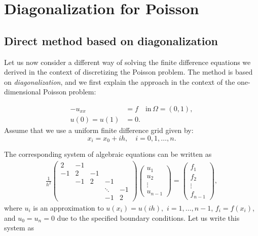 \chapter{Diagonalization for Poisson}

\section{Direct method based on diagonalization}

Let us now consider a different way of solving the finite difference equations
we derived in the context of discretizing the Poisson problem. The method is
based on \emph{diagonalization}, and we first explain the approach in the context
of the one-dimensional Poisson problem:

\begin{align*}
  -u_{xx} &= f \quad \text{in}\, \Omega = (0,1), \\
  u(0) = u(1) &= 0.
\end{align*}
Assume that we use a uniform finite difference grid given by:
\begin{equation*}
  x_i = x_0 + ih, \quad i=0,1,\ldots,n.
\end{equation*}

The corresponding system of algebraic equations can be written as
\begin{align*}
  \frac{1}{h^2}
  \begin{pmatrix}
    2 & -1 & & & \\
    -1 & 2 & -1 & & \\
    & -1 & 2 & -1 & \\
    & & & \ddots & -1 \\
    & & & -1 & 2
  \end{pmatrix}
  \begin{pmatrix}
    u_1 \\
    u_2 \\
    \vdots \\
    u_{n-1}
  \end{pmatrix}
  =
  \begin{pmatrix}
    f_1 \\
    f_2 \\
    \vdots \\
    f_{n-1}
  \end{pmatrix},
\end{align*}
where $u_i$ is an approximation to $u(x_i) = u(ih),$ $i=1,\ldots,n-1$,
$f_i=f(x_i)$, and $u_0 = u_n = 0$ due to the specified boundary conditions. Let
us write this system as

